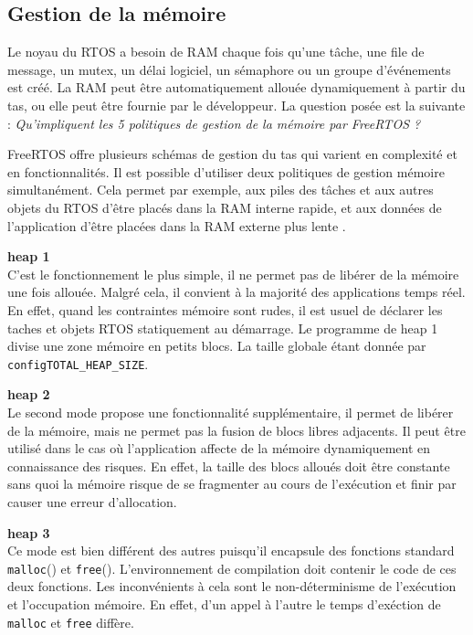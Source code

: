\subsection{Gestion de la mémoire}
Le noyau du RTOS a besoin de RAM chaque fois qu'une tâche, une file de message, un mutex, un délai logiciel, un sémaphore ou un groupe d'événements est créé. 
La RAM peut être automatiquement allouée dynamiquement à partir du tas, ou elle peut être fournie par le développeur.
La question posée est la suivante :
\textit{Qu’impliquent les 5 politiques de gestion de la mémoire par FreeRTOS ?}
\gap

FreeRTOS offre plusieurs schémas de gestion du tas qui varient en complexité et en fonctionnalités.
Il est possible d'utiliser deux politiques de gestion mémoire simultanément.
Cela permet par exemple, aux piles des tâches et aux autres objets du RTOS d'être placés dans la RAM interne rapide, et aux données de l'application d'être placées dans la RAM externe plus lente \cite{web_freeRTOS_heap}.

\noindent
\textbf{heap 1} \\
C'est le fonctionnement le plus simple, il ne permet pas de libérer de la mémoire une fois allouée.
Malgré cela, il convient à la majorité des applications temps réel.
En effet, quand les contraintes mémoire sont rudes, il est usuel de déclarer les taches et objets RTOS statiquement au démarrage.
Le programme de heap 1 divise une zone mémoire en petits blocs.
La taille globale étant donnée par \texttt{configTOTAL\_HEAP\_SIZE}.

\noindent
\textbf{heap 2} \\
Le second mode propose une fonctionnalité supplémentaire, il permet de libérer de la mémoire, mais ne permet pas la fusion de blocs libres adjacents.
Il peut être utilisé dans le cas où l'application affecte de la mémoire dynamiquement en connaissance des risques.
En effet, la taille des blocs alloués doit être constante sans quoi la mémoire risque de se fragmenter au cours de l'exécution et finir par causer une erreur d'allocation.

\noindent
\textbf{heap 3} \\
Ce mode est bien différent des autres puisqu'il encapsule des fonctions standard \texttt{malloc}() et \texttt{free}().
L'environnement de compilation doit contenir le code de ces deux fonctions.
Les inconvénients à cela sont le non-déterminisme de l'exécution et l'occupation mémoire.
En effet, d'un appel à l'autre le temps d'exéction de \texttt{malloc} et \texttt{free} diffère.

